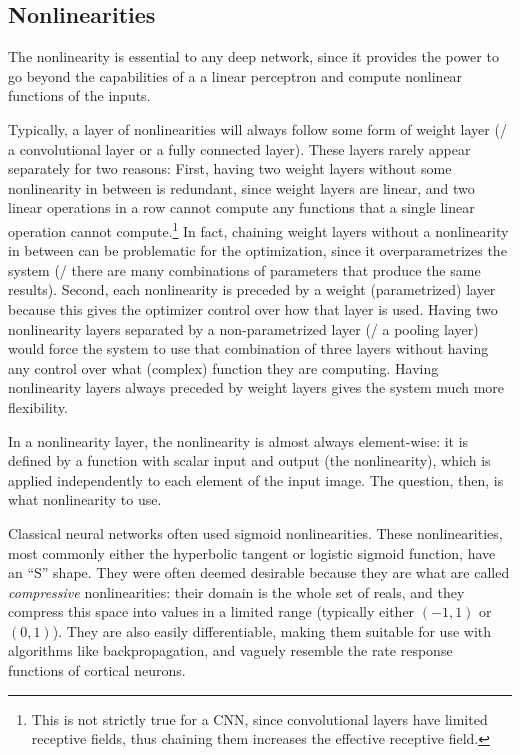 \subsection{Nonlinearities}

The nonlinearity is essential to any deep network,
since it provides the power to go beyond the capabilities of a a linear perceptron
and compute nonlinear functions of the inputs.

Typically, a layer of nonlinearities will always follow some form of weight layer
(\eg/ a convolutional layer or a fully connected layer).
These layers rarely appear separately for two reasons:
First, having two weight layers without some nonlinearity in between is redundant,
since weight layers are linear,
and two linear operations in a row cannot compute any functions that a single
linear operation cannot compute.\footnote{
  This is not strictly true for a CNN,
  since convolutional layers have limited receptive fields,
  thus chaining them increases the effective receptive field.}
In fact, chaining weight layers without a nonlinearity in between
can be problematic for the optimization,
since it overparametrizes the system
(\ie/ there are many combinations of parameters that produce the same results).
Second, each nonlinearity is preceded by a weight (parametrized) layer
because this gives the optimizer control over how that layer is used.
Having two nonlinearity layers separated by a non-parametrized layer
(\eg/ a pooling layer) would force the system to use that combination
of three layers without having any control over what (complex) function
they are computing.
Having nonlinearity layers always preceded by weight layers
gives the system much more flexibility.

In a nonlinearity layer,
the nonlinearity is almost always element-wise:
it is defined by a function with scalar input and output (the nonlinearity),
which is applied independently to each element of the input image.
The question, then, is what nonlinearity to use.

Classical neural networks often used sigmoid nonlinearities.
These nonlinearities, most commonly either the hyperbolic tangent
or logistic sigmoid function,
have an ``S'' shape.
They were often deemed desirable because
they are what are called \emph{compressive} nonlinearities:
their domain is the whole set of reals,
and they compress this space into values in a limited range
(typically either $(-1, 1)$ or $(0, 1)$).
They are also easily differentiable,
making them suitable for use with algorithms like backpropagation,
and vaguely resemble the rate response functions of cortical neurons.


